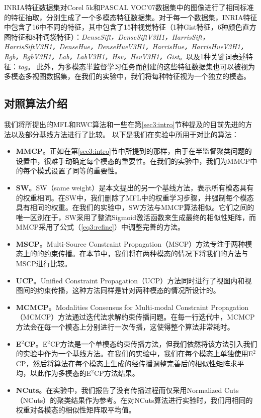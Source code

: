 INRIA特征数据集\cite{guillaumin2009tagprop}对Corel 5k和PASCAL VOC'07数据集中的图像进行了相同标准的特征抽取，分别生成了一个多模态特征数据集。对于每一个数据集，INRIA特征中包含了16中不同的特征，其中包含了15种视觉特征（1种Gist特征，6种颜色直方图特征和8种词袋特征）：\textit{DenseSift，DenseSiftV3H1，HarrisSift，HarrisSiftV3H1，DenseHue，DenseHueV3H1，HarrisHue，HarrisHueV3H1，Rgb，RgbV3H1，Lab，LabV3H1，Hsv，HsvV3H1，Gist}。以及1种关键词表述特征：\textit{tag}。
此外，为多模态半监督学习任务而创建的这些特征数据集也可以被视为多模态多视图数据集，在我们的实验中，我们将每种特征视为一个独立的模态。

\subsection{对照算法介绍}
我们将所提出的MFL和RWC算法和一些在第\ref{sec3:intro}节种提及的目前先进的方法以及部分基线方法进行了比较。
以下是我们在实验中所用于对比的算法：
\begin{itemize}
    \item {\textbf{MMCP}}。正如在第\ref{sec3:intro}节中所提到的那样，由于在半监督聚类问题的设置中，很难手动确定每个模态的重要性。在我们的实验中，我们为MMCP\cite{fu2011multi}中的每个模式设置了同等的重要性。
    \item {\textbf{SW}}。SW（same weight）是本文提出的另一个基线方法，表示所有模态具有的权重相同。在SW中，我们删除了MFL中的权重学习步骤，并强制每个模态具有相同的权重。在我们的实验中，SW方法与MMCP算法相似。它们之间的唯一区别在于，SW采用了整流Sigmoid激活函数来生成最终的相似性矩阵，而MMCP采用了公式（\ref{eq3:refine}）中调整完善的方法。
    \item {\textbf{MSCP}}。Multi-Source Constraint Propagation（MSCP）\cite{lu2013exhaustive}方法专注于两种模态上的的约束传播。在本节中，我们将在两种模态的情况下将我们的方法与MSCP进行比较。
    \item {\textbf{UCP}}。Unified Constraint Propagation（UCP）\cite{lu2013unified}方法同时进行了视图内和视图间的约束传播，这种方法同样是针对两种模态的情况所设计的。
    \item {\textbf{MCMCP}}。Modalities Consensus for Multi-modal Constraint Propagation（MCMCP）\cite{fu2012modalities}方法通过迭代法求解约束传播问题。在每一行迭代中，MCMCP方法会在每一个模态上分别进行一次传播，这使得整个算法非常耗时。
    \item {\textbf{E$^2$CP}}。E$^2$CP\cite{lu2010constrained}方法是一个单模态约束传播方法，但我们依然将该方法引入我们的实验中作为一个基线方法。在我们的实验中，我们在每个模态上单独使用E$^2$CP，然后将算法在每个模态上生成的经传播调整完善后的相似性矩阵求平均，以此作为多模态的E$^2$CP方法结果。
    \item {\textbf{NCuts}}。在实验中，我们报告了没有传播过程而仅采用Normalized Cuts（NCuts）\cite{shi2000normalized}的聚类结果作为参考。在对NCuts算法进行实验时，我们用相同的权重对各模态的相似性矩阵取平均值。
\end{itemize}

